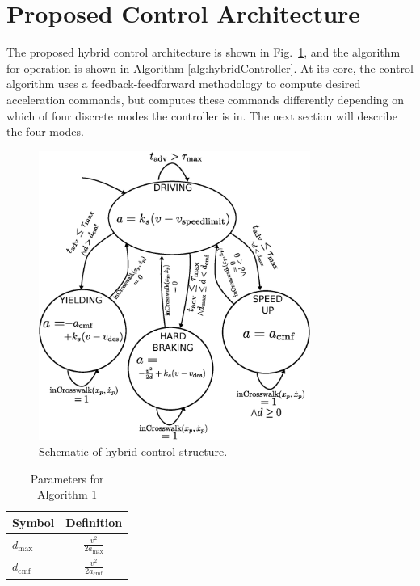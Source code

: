 \documentclass[letterpaper, 10 pt, conference]{ieeeconf} %
\begin{document}
\section{Proposed Control Architecture}

The proposed hybrid control architecture is shown in Fig.~\ref{fig:hybridController}, and the algorithm for operation is shown in Algorithm \ref{alg:hybridController}. At its core, the control algorithm uses a feedback-feedforward methodology to compute desired acceleration commands, but computes these commands differently depending on which of four discrete modes the controller is in. The next section will describe the four modes. 

\begin{figure}
\centering
\includegraphics[width=3.5in]{stateDiagram2.eps}
\caption{Schematic of hybrid control structure.}
\label{fig:hybridController}
\end{figure}

\begin{table}[h]
\begin{center}
\caption{Parameters for Algorithm 1}\label{tb:params}
\begin{tabular}{lc}
Symbol & Definition \\\hline\hline
$d_\mathrm{max}$ & $\frac{v^2}{2a_\mathrm{max}}$ \\
$d_\mathrm{cmf}$ & $\frac{v^2}{2a_\mathrm{cmf}}$ \\\hline
\end{tabular}
\end{center}
\end{table}
\end{document}
